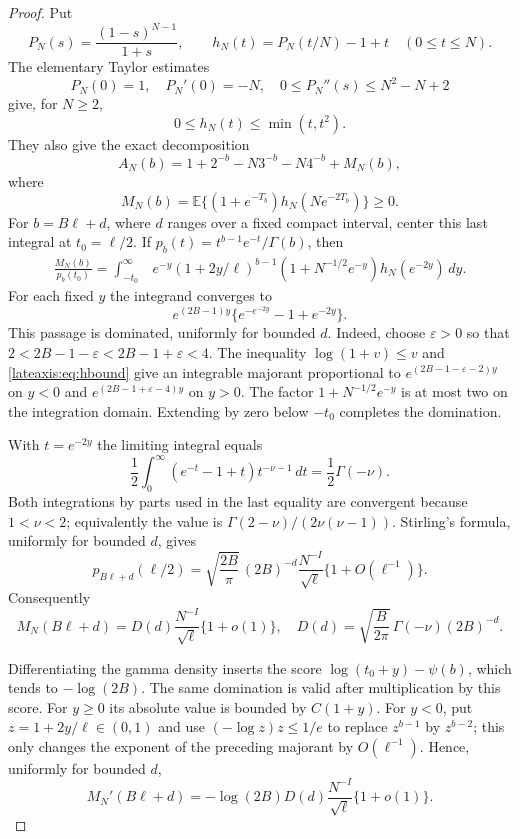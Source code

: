 \begin{proof}
Put
\[
 P_N(s)=\frac{(1-s)^{N-1}}{1+s},\qquad
 h_N(t)=P_N(t/N)-1+t\quad(0\le t\le N).
\]
The elementary Taylor estimates
\[
 P_N(0)=1,\quad P_N'(0)=-N,\quad
 0\le P_N''(s)\le N^2-N+2
\]
give, for $N\ge2$,
\begin{equation}\label{lateaxis:eq:hbound}
 0\le h_N(t)\le\min(t,t^2).
\end{equation}
They also give the exact decomposition
\begin{equation}\label{lateaxis:eq:decompose}
 A_N(b)=1+2^{-b}-N3^{-b}-N4^{-b}+M_N(b),
\end{equation}
where
\[
 M_N(b)=\mathbb E\{(1+e^{-T_b})h_N(Ne^{-2T_b})\}\ge0.
\]
For $b=B\ell+d$, where $d$ ranges over a fixed compact interval,
center this last integral at $t_0=\ell/2$.  If
$p_b(t)=t^{b-1}e^{-t}/\Gamma(b)$, then
\begin{align*}
 \frac{M_N(b)}{p_b(t_0)}
 =\int_{-t_0}^\infty &e^{-y}(1+2y/\ell)^{b-1}
       (1+N^{-1/2}e^{-y})h_N(e^{-2y})\,dy.
\end{align*}
For each fixed $y$ the integrand converges to
\[
 e^{(2B-1)y}\{e^{-e^{-2y}}-1+e^{-2y}\}.
\]
This passage is dominated, uniformly for bounded $d$.  Indeed, choose
$\varepsilon>0$ so that $2<2B-1-\varepsilon<2B-1+\varepsilon<4$.
The inequality $\log(1+v)\le v$ and \eqref{lateaxis:eq:hbound}
give an integrable majorant proportional to
$e^{(2B-1-\varepsilon-2)y}$ on $y<0$ and
$e^{(2B-1+\varepsilon-4)y}$ on $y>0$.
The factor $1+N^{-1/2}e^{-y}$ is at most two on the integration
domain.  Extending by zero below $-t_0$ completes the domination.

With $t=e^{-2y}$ the limiting integral equals
\begin{equation}\label{lateaxis:eq:mellin}
 \frac12\int_0^\infty
       (e^{-t}-1+t)t^{-\nu-1}\,dt
 =\frac12\Gamma(-\nu).
\end{equation}
Both integrations by parts used in the last equality are convergent
because $1<\nu<2$; equivalently the value is
$\Gamma(2-\nu)/(2\nu(\nu-1))$.
Stirling's formula, uniformly for bounded $d$, gives
\[
 p_{B\ell+d}(\ell/2)
 =\sqrt{\frac{2B}{\pi}}\,(2B)^{-d}
       \frac{N^{-I}}{\sqrt\ell}\{1+O(\ell^{-1})\}.
\]
Consequently
\begin{equation}\label{lateaxis:eq:Mlimit}
 M_N(B\ell+d)=D(d)\frac{N^{-I}}{\sqrt\ell}\{1+o(1)\},
 \quad D(d)=\sqrt{\frac{B}{2\pi}}\,\Gamma(-\nu)(2B)^{-d}.
\end{equation}

Differentiating the gamma density inserts the score
$\log(t_0+y)-\psi(b)$, which tends to $-\log(2B)$.
The same domination is valid after multiplication by this score.
For $y\ge0$ its absolute value is bounded by $C(1+y)$.
For $y<0$, put $z=1+2y/\ell\in(0,1)$ and use
$(-\log z)z\le1/e$ to replace $z^{b-1}$ by $z^{b-2}$;
this only changes the exponent of the preceding majorant by
$O(\ell^{-1})$.  Hence, uniformly for bounded $d$,
\begin{equation}\label{lateaxis:eq:Mprime}
 M_N'(B\ell+d)=-\log(2B)D(d)
                       \frac{N^{-I}}{\sqrt\ell}\{1+o(1)\}.
\end{equation}


\end{proof}
